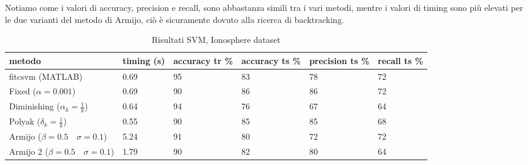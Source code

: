 \documentclass[12pt]{extarticle}
\begin{document}
Notiamo come i valori di accuracy, precision e recall, sono abbastanza simili tra i vari metodi, mentre i valori di timing sono più elevati per le due varianti del metodo di Armijo, ciò è sicuramente dovuto alla ricerca di backtracking.\\
\begin{table}[H]
    \setlength{\tabcolsep}{10pt} %
    \renewcommand{\arraystretch}{1.2} %
    \centering
    \begin{tabular}{ |p{3cm}||p{1.5cm}|p{2cm}|p{2cm}|p{2cm}|p{1.5cm}|  }
    \hline
    metodo & timing (s) & accuracy tr \% & accuracy ts \% & precision ts \% & recall ts \%\\
    \hline
    \hline
    fitcsvm (MATLAB) & 0.69  & 95 & 83 & 78 & 72\\
    \hline
    \hline
    Fixed ($\alpha = 0.001$) & 0.69 & 90 & 86 & 86 & 72\\
    \hline
    Diminishing ($\alpha_k = \frac{1}{k}$) & 0.64 & 94 & 76 & 67 & 64\\
    \hline
    Polyak ($\delta_k = \frac{1}{k}$) & 0.55 & 90 & 85 & 85 & 68\\
    \hline
    Armijo ($\beta = 0.5 \quad \sigma = 0.1$) & 5.24 & 91 & 80 & 72 & 72\\
    \hline
    Armijo 2 ($\beta = 0.5 \quad \sigma = 0.1$) & 1.79 & 90 & 82 & 80 & 64\\
    \hline
    \end{tabular}
    \caption{Risultati SVM, Ionosphere dataset}
    \label{table:svmresults}
\end{table}


\end{document}

